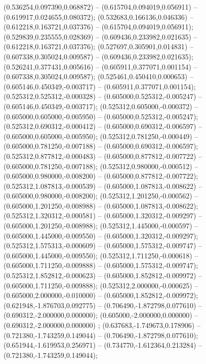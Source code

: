  (0.536254,0.097390,0.068872) -- (0.615704,0.094019,0.056911) -- (0.619917,0.024655,0.080372);
 (0.532683,0.166136,0.046336) -- (0.612218,0.163721,0.037376) -- (0.615704,0.094019,0.056911);
 (0.529839,0.235555,0.028369) -- (0.609436,0.233982,0.021635) -- (0.612218,0.163721,0.037376);
 (0.527697,0.305901,0.014831) -- (0.607338,0.305024,0.009587) -- (0.609436,0.233982,0.021635);
 (0.526241,0.377431,0.005616) -- (0.605911,0.377071,0.001154) -- (0.607338,0.305024,0.009587);
 (0.525461,0.450410,0.000653) -- (0.605146,0.450349,-0.003717) -- (0.605911,0.377071,0.001154);
 (0.525312,0.525312,-0.000328) -- (0.605000,0.525312,-0.005247) -- (0.605146,0.450349,-0.003717);
 (0.525312,0.605000,-0.000372) -- (0.605000,0.605000,-0.005950) -- (0.605000,0.525312,-0.005247);
 (0.525312,0.690312,-0.000412) -- (0.605000,0.690312,-0.006597) -- (0.605000,0.605000,-0.005950);
 (0.525312,0.781250,-0.000449) -- (0.605000,0.781250,-0.007188) -- (0.605000,0.690312,-0.006597);
 (0.525312,0.877812,-0.000483) -- (0.605000,0.877812,-0.007722) -- (0.605000,0.781250,-0.007188);
 (0.525312,0.980000,-0.000512) -- (0.605000,0.980000,-0.008200) -- (0.605000,0.877812,-0.007722);
 (0.525312,1.087813,-0.000539) -- (0.605000,1.087813,-0.008622) -- (0.605000,0.980000,-0.008200);
 (0.525312,1.201250,-0.000562) -- (0.605000,1.201250,-0.008988) -- (0.605000,1.087813,-0.008622);
 (0.525312,1.320312,-0.000581) -- (0.605000,1.320312,-0.009297) -- (0.605000,1.201250,-0.008988);
 (0.525312,1.445000,-0.000597) -- (0.605000,1.445000,-0.009550) -- (0.605000,1.320312,-0.009297);
 (0.525312,1.575313,-0.000609) -- (0.605000,1.575312,-0.009747) -- (0.605000,1.445000,-0.009550);
 (0.525312,1.711250,-0.000618) -- (0.605000,1.711250,-0.009888) -- (0.605000,1.575312,-0.009747);
 (0.525312,1.852812,-0.000623) -- (0.605000,1.852812,-0.009972) -- (0.605000,1.711250,-0.009888);
 (0.525312,2.000000,-0.000625) -- (0.605000,2.000000,-0.010000) -- (0.605000,1.852812,-0.009972);
 (0.621948,-1.876703,0.092775) -- (0.706490,-1.872798,0.077610) -- (0.690312,-2.000000,0.000000);
 (0.605000,-2.000000,0.000000) -- (0.690312,-2.000000,0.000000) ;
 (0.637683,-1.749673,0.178906) -- (0.721380,-1.743259,0.149044) -- (0.706490,-1.872798,0.077610);
 (0.651944,-1.619953,0.256971) -- (0.734770,-1.612364,0.213284) -- (0.721380,-1.743259,0.149044);
